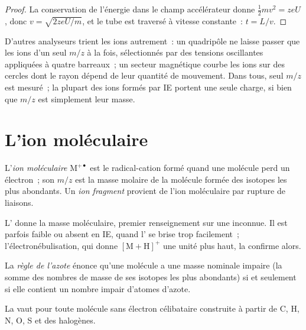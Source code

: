 \begin{proof}
La conservation de l'énergie dans le champ accélérateur donne $\tfrac12mv^2 = zeU$, donc $v = \sqrt{2zeU/m}$,
et le tube est traversé à vitesse constante~: $t = L/v$.
\end{proof}

D'autres analyseurs trient les ions autrement~: un quadripôle ne laisse passer que les ions d'un seul $m/z$
à la fois, sélectionnés par des tensions oscillantes appliquées à quatre barreaux~; un secteur magnétique
courbe les ions sur des cercles dont le rayon dépend de leur quantité de mouvement. Dans tous, seul $m/z$
est mesuré~; la plupart des ions formés par IE portent une seule charge, si bien que $m/z$ est simplement
leur masse.

\section{L'ion moléculaire}

\begin{definition}\label{def:b2:mass-spec-atomic:molecular-ion}
L'\emph{ion moléculaire} $\mathrm M^{+\bullet}$ est le
radical-cation formé quand une molécule perd un électron~; son $m/z$ est la masse molaire de la molécule
formée des isotopes les plus abondants. Un \emph{ion fragment} provient de l'ion
moléculaire par rupture de liaisons.
\end{definition}

L' donne la masse moléculaire, premier renseignement sur une inconnue. Il est parfois
faible ou absent en IE, quand l' se brise trop facilement~; l'électronébulisation, qui
donne $[\mathrm M +
\mathrm H]^+$ une unité plus haut, la confirme alors.

\begin{definition}\label{def:b2:mass-spec-atomic:nitrogen-rule}
La \emph{règle de l'azote} énonce qu'une molécule a une masse
nominale impaire (la somme des nombres de masse de ses isotopes les plus abondants) si et seulement si
elle contient un nombre impair d'atomes d'azote.
\end{definition}

\begin{proposition}\label{prop:b2:mass-spec-atomic:nitrogen-rule}
La  vaut pour toute molécule sans électron célibataire construite à partir de C, H, N,
O, S et des halogènes.
\end{proposition}


